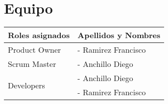 \chapter{Equipo}

\begin{table}[htbp]
	\begin{center}
		\begin{tabular}{| p{5.2cm}| p{5.2cm} |}
			\hline
			\textbf{Roles asignados} & \textbf {Apellidos y Nombres}\\\hline
			Product Owner & - Ramirez Francisco \\\hline
			Scrum Master & - Anchillo Diego \\\hline
			\multirow{2}{1cm}{Developers} & - Anchillo Diego \\	& - Ramirez Francisco \\ \hline
		\end{tabular}
	\end{center}
\end{table}